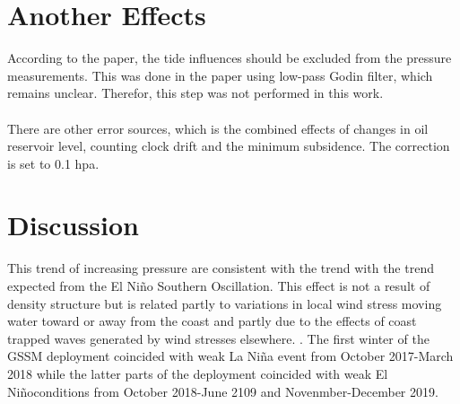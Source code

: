 \section{Another Effects}
According to the paper, the tide influences should be excluded from the pressure measurements. This was done in the paper using low-pass Godin filter, which remains unclear. Therefor, this step was not performed in this work.\\\\
There are other error sources, which is the combined effects of changes in oil reservoir level, counting clock drift and the minimum subsidence. The correction is set to 0.1 hpa. 



\section{Discussion}
This trend of increasing pressure are consistent with the trend with the trend expected from the El Niño Southern Oscillation. This effect is not a result of density structure but is related partly to variations in local wind stress moving water toward or away from the coast and partly due to the effects of coast trapped waves generated by wind stresses elsewhere. \cite{ryan2002sea}. The first winter of the GSSM deployment coincided with weak La Niña event from October 2017-March 2018 while the latter parts of the deployment coincided with weak El Niñoconditions from October 2018-June 2109 and Novenmber-December 2019.